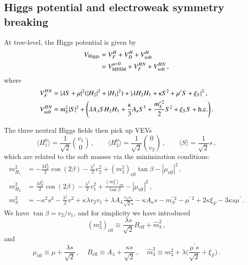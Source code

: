\documentclass[final,3p,times,pdflatex]{elsarticle}
\newcommand{\be}{\begin{equation}}
\newcommand{\ee}{\end{equation}}
\newcommand{\ds}{\displaystyle}
\newcommand{\lamsq}{\lambda^2}
\begin{document}
\subsection{Higgs potential and electroweak symmetry breaking}\label{sec:hpot}
At tree-level, the Higgs potential is given by
%
\begin{align}
V_\mathrm{Higgs} &=  V^H_F + V^H_D + V_{\rm soft}^H  \\
&=  V^{\mu=0}_\mathrm{MSSM} + V^{HN}_{F} + V_{\rm soft}^{HN}\,,
%
\end{align} 
where 
\begin{align}
V^{HN}_{F} &=   |\lambda S + \mu|^2 (|H_2|^2+|H_1|^2) + |\lambda H_2H_1
+\kappa S^2 + \mu^\prime S + \xi_S|^2  \,, \label{eq:HpotF} \\
 V_{\rm soft}^{HN}  &=   m_S^2|S|^2
+ \Bigg(\lambda A_{\lambda}SH_2H_1+\frac{\kappa}{3} A_{\kappa}S^3+ \ds\frac{m_S^{\prime \, 2}}{2} S^2 + \xi_S S + \textrm{h.c.} \Bigg)\,.
\label{eq:HpotS} 
\end{align}

\noindent The three neutral Higgs fields then pick up VEVs
%  
\be 
        \langle H_1^0 \rangle = \ds\frac{1}{\sqrt{2}}{v_1 \choose 0}\,, 
\qquad  \langle H_2^0 \rangle = \ds\frac{1}{\sqrt{2}}{0 \choose v_2}\,, 
\qquad  \langle S \rangle =  \ds\frac{1}{\sqrt{2}}s\,, \label{eq:potmin} 
\ee
%  
\noindent which are related to the soft masses via the minimization conditions:
%
\begin{align}
m_{H_1}^2&= -\frac{M_Z^2}{2}\cos(2\beta) - \ds\frac{\lamsq}{2} v_2^2
 + (m_3^2)_\textrm{eff} \tan\beta 
- |\mu_\textrm{eff}|^2\,, \label{eq:mind}\\
m_{H_2}^2&= \frac{M_Z^2}{2}\cos(2\beta) - \ds\frac{\lamsq}{2}v_1^2 
+  \frac{(m_3^2)_\textrm{eff}}{\tan\beta} 
- |\mu_\textrm{eff}|^2 \,, \label{eq:minu} \\
m_S^2 &= -\kappa^2 s^2 - \ds\frac{\lamsq}{2} 
v^2 + \kappa\lambda v_2v_1
+ \lambda A_{\lambda} \frac{v_2v_1}{\sqrt{2}s}
-\kappa A_{\kappa}s  - m^{\prime \,2}_S - \mu^{\prime \,2} + 2 \kappa \xi_F  - 3 \kappa s \mu^\prime \,.\label{eq:mins}
\end{align}
%
We have $\tan \beta = v_2 /  v_1$, %
and for simplicity we have introduced
\be (m_3^2)_\textrm{eff} \equiv
 \ds\frac{ \lambda s}{\sqrt{2}} B_\textrm{eff} + \widehat{m}_3^2\,, \ee and
\be  \mu_\textrm{eff} \equiv
 \mu + \frac{\lambda s}{\sqrt{2}}\,, \;\;\;\; B_\textrm{eff}\equiv A_\lambda+\ds\frac{\kappa s}{\sqrt{2}}\,, \;\;\;\; \widehat{m}_3^2 \equiv m_3^2 + \lambda \Bigg(\ds\frac{\mu^\prime s}{\sqrt{2}} + \xi_F\Bigg)\,. \ee
\end{document}
